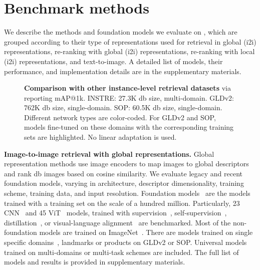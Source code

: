 \section{Benchmark methods}
We describe the methods and foundation models we evaluate on \ours, which are grouped according to their type of representations used for retrieval in global (i2i) representations, re-ranking with global (i2i) representations, re-ranking with local (i2i) representations, and text-to-image. A detailed list of models, their performance, and implementation details are in the supplementary materials.

\begin{figure*}[t]
  \vspace{-10pt}
  \centering
  \scalebox{0.9}{
    \hspace{10pt}
     
    \hspace{10pt}
    
    \hspace{10pt}
     
  }
  \vspace{-7pt}
  \caption{\textbf{Comparison with other instance-level retrieval datasets} via reporting mAP@1k. INSTRE: 27.3K db size, multi-domain. GLDv2: 762K db size, single-domain. SOP:  60.5K db size, single-domain. Different network types are color-coded. For GLDv2 and SOP, models fine-tuned on these domains with the corresponding training sets are highlighted. No linear adaptation is used.
  \label{fig:instre_gld_sop}
  \vspace{-12pt}
  }
\end{figure*}

\noindent\textbf{Image-to-image retrieval with global representations.} Global representation methods use image encoders to map images to global descriptors and rank db images based on cosine similarity. 
We evaluate legacy and recent foundation models, varying in architecture, descriptor dimensionality, training scheme, training data, and input resolution. Foundation models~\cite{bha+} are the models trained with a training set on the scale of a hundred million. 
Particularly, 23 CNN~\cite{ksh12,sz14,slj+15,hzr+16,zvs+18,tl19,convnext} and 45 ViT~\cite{dbk+21,fwx+23} models, trained with supervision~\cite{wtj+21,vit-augreg,tcd+21,kjk23}, self-supervision~\cite{odm+24,cmm+20,hfw+20,ctm+21}, distillation~\cite{ady+23,tcd+21,swl+24}, or visual-language alignment~\cite{clip,metaclip,siglip,cbw+23,evaclip,siglip2} are benchmarked. 
Most of the non-foundation models are trained on ImageNet~\cite{dds+09}. There are models trained on single specific domains~\cite{sck+23,lsl+22,ptm+22}, \ie landmarks or products on GLDv2 or SOP.
Universal models~\cite{ycc+23,yca+24,ady+23,swl+24} trained on multi-domains or multi-task schemes are included.
The full list of models and results is provided in supplementary materials.

